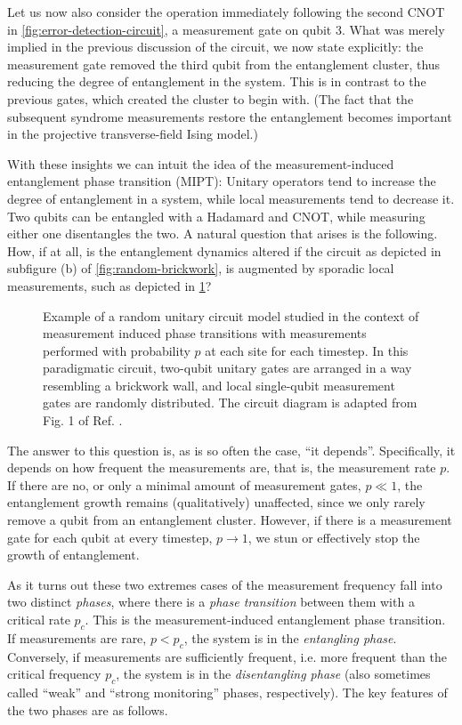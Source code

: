 Let us now also consider the operation immediately following the second CNOT in
\cref{fig:error-detection-circuit}, a measurement gate on qubit 3. What was
merely implied in the previous discussion of the circuit, we now state
explicitly: the measurement gate removed the third qubit from the entanglement
cluster, thus reducing the degree of entanglement in the system. This is in
contrast to the previous gates, which created the cluster to begin with. (The
fact that the subsequent syndrome measurements restore the entanglement becomes
important in the projective transverse-field Ising model.) 

With these insights we can intuit the idea of the measurement-induced
entanglement phase transition (MIPT): Unitary operators tend to increase the
degree of entanglement in a system, while local measurements tend to decrease
it. Two qubits can be entangled with a Hadamard and CNOT, while measuring
either one disentangles the two. A natural question that arises is the
following. How, if at all, is the entanglement dynamics altered if the circuit
as depicted in subfigure (b) of \cref{fig:random-brickwork}, is augmented by
sporadic local measurements, such as depicted in \cref{fig:hybrid-circuit}?

\begin{figure}[t]
  \centering
  
  \caption{Example of a random unitary circuit model studied in the context of
    measurement induced phase transitions with measurements performed with
    probability $p$ at each site for each timestep. In this paradigmatic
    circuit, two-qubit unitary gates are arranged in a way resembling a
    brickwork wall, and local single-qubit measurement gates are randomly
  distributed. The circuit diagram is adapted from Fig. 1 of Ref.
\cite{liMeasurementdrivenEntanglementTransition2019}.}
  \label{fig:hybrid-circuit}
\end{figure}

The answer to this question is, as is so often the case, \enquote{it depends}.
Specifically, it depends on how frequent the measurements are, that is, the
measurement rate $p$. If there are no, or only a minimal amount of measurement
gates, $p\ll 1$, the entanglement growth remains (qualitatively) unaffected,
since we only rarely remove a qubit from an entanglement cluster. However, if
there is a measurement gate for each qubit at every timestep, $p\to 1$, we stun
or effectively stop the growth of entanglement.

As it turns out these two extremes cases of the measurement frequency fall into
two distinct \emph{phases}, where there is a \emph{phase transition} between
them with a critical rate $p_c$. This is the measurement-induced entanglement phase transition. If
measurements are rare, $p<p_c$, the system is in the \emph{entangling phase}.
Conversely, if measurements are sufficiently frequent, i.e. more frequent than
the critical frequency $p_c$, the system is in the \emph{disentangling phase}
(also sometimes called \enquote{weak} and \enquote{strong monitoring} phases,
respectively). The key features of the two phases are as follows.

